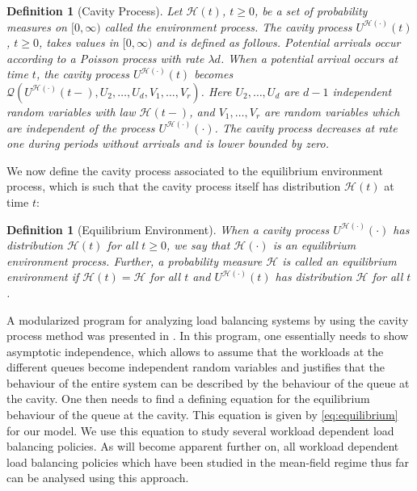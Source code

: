 \documentclass[12pt]{report}
\newtheorem{definition}[theorem]{Definition}
\begin{document}
\begin{definition}[Cavity Process]
Let $\mathcal{H}(t)$, $t \geq 0$, be a set of probability measures on $[0,\infty)$ called the {\it environment process}. 
The {\it cavity process} $U^{\mathcal{H}(\cdot)}(t)$, $t \geq 0$, takes values in $[0,\infty)$ and is defined as follows. 
Potential arrivals occur according to a Poisson process with rate $\lambda d$. When a potential arrival occurs at time $t$, the cavity process $U^{\mathcal{H}(\cdot)}(t)$ becomes $\mathcal{Q}(U^{\mathcal{H}(\cdot)}(t-),U_2,\dots,U_d,V_1,\dots,V_r)$. Here $U_2,\dots,U_d$ are $d-1$ independent random variables with law $\mathcal{H}(t-)$, and $V_1,\dots, V_r$ are random variables which are independent of the process $U^{\mathcal{H}(\cdot)}(\cdot)$.
The cavity process decreases at rate one during periods without arrivals and is lower bounded by zero.
\end{definition}

We now define the cavity process associated to the equilibrium environment process, which is such that the cavity process itself has distribution $\mathcal{H}(t)$ at time $t$:
\begin{definition}[Equilibrium Environment]
When a cavity process $U^{\mathcal{H}(\cdot)}(\cdot)$ has distribution 
$\mathcal{H}(t)$ for all $t \geq 0$, we say that $\mathcal{H}(\cdot)$ is an {\it equilibrium environment process}. 
Further, a probability measure $\mathcal{H}$ is called an {\it equilibrium environment} if 
$\mathcal{H}(t) = \mathcal{H}$ for all $t$ and $U^{\mathcal{H}(\cdot)}(t)$ has distribution $\mathcal{H}$ for all $t$.
\end{definition}
A modularized program for analyzing load balancing systems by using the cavity process method was presented in \cite{bramsonLB}. In this program, one essentially needs to show asymptotic independence, which allows to assume that the workloads at the different queues become independent random variables and justifies that the behaviour of the entire system can be described by the behaviour of the queue at the cavity. One then needs to find a defining equation for the equilibrium behaviour of the queue at the cavity. This equation is given by \eqref{eq:equilibrium} for our model. We use this equation to study several workload dependent load balancing policies. As will become apparent further on, all workload dependent load balancing policies which have been studied in the mean-field regime thus far can be analysed using this approach. 
\end{document}
